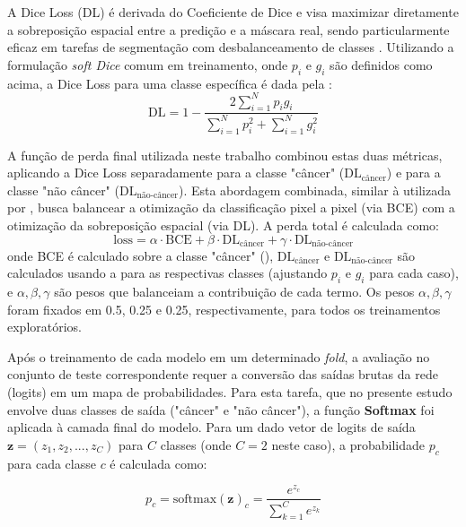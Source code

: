 A Dice Loss (DL) é derivada do Coeficiente de Dice e visa maximizar diretamente a sobreposição espacial entre a predição e a máscara real, sendo particularmente eficaz em tarefas de segmentação com desbalanceamento de classes \cite{Milletari2016}. Utilizando a formulação \textit{soft Dice} comum em treinamento, onde $p_i$ e $g_i$ são definidos como acima, a Dice Loss para uma classe específica é dada pela :
\begin{equation}\label{eq:dl_formula}
    \text{DL} = 1 - \frac{2 \sum_{i=1}^{N} p_i g_i}{\sum_{i=1}^{N} p_i^2 + \sum_{i=1}^{N} g_i^2}
\end{equation}


A função de perda final utilizada neste trabalho combinou estas duas métricas, aplicando a Dice Loss separadamente para a classe "câncer" ($\text{DL}_{\text{câncer}}$) e para a classe "não câncer" ($\text{DL}_{\text{não-câncer}}$). Esta abordagem combinada, similar à utilizada por \textcite{Khened2021}, busca balancear a otimização da classificação pixel a pixel (via BCE) com a otimização da sobreposição espacial (via DL). A perda total é calculada como:
\begin{equation}\label{eq:loss_total_nova} %
    \text{loss} = \alpha \cdot \text{BCE} + \beta \cdot \text{DL}_{\text{câncer}} + \gamma \cdot \text{DL}_{\text{não-câncer}}
\end{equation}
onde BCE é calculado sobre a classe "câncer" (), $\text{DL}_{\text{câncer}}$ e $\text{DL}_{\text{não-câncer}}$ são calculados usando a  para as respectivas classes (ajustando $p_i$ e $g_i$ para cada caso), e $\alpha, \beta, \gamma$ são pesos que balanceiam a contribuição de cada termo. Os pesos $\alpha, \beta, \gamma$ foram fixados em 0.5, 0.25 e 0.25, respectivamente, para todos os treinamentos exploratórios.

Após o treinamento de cada modelo em um determinado \textit{fold}, a avaliação no conjunto de teste correspondente requer a conversão das saídas brutas da rede (logits) em um mapa de probabilidades. Para esta tarefa, que no presente estudo envolve duas classes de saída ("câncer" e "não câncer"), a função \textbf{Softmax} \cite{Bishop2006} foi aplicada à camada final do modelo. Para um dado vetor de logits de saída $\mathbf{z} = (z_1, z_2, ..., z_C)$ para $C$ classes (onde $C=2$ neste caso), a probabilidade $p_c$ para cada classe $c$ é calculada como:

\begin{equation}\label{eq:softmax}
    p_c = \text{softmax}(\mathbf{z})_c = \frac{e^{z_c}}{\sum_{k=1}^{C} e^{z_k}}
\end{equation}

